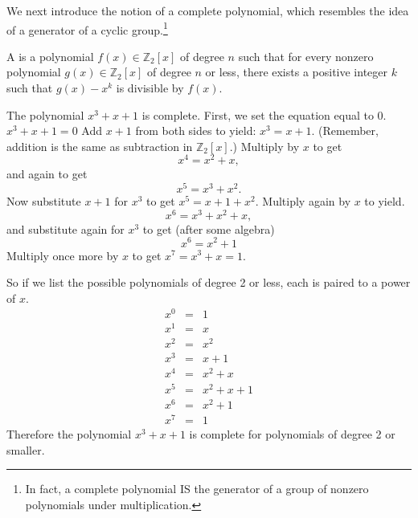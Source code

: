 %
%

We next introduce the notion of a complete polynomial, which resembles the idea of a generator of a cyclic group.\footnote{In fact, a complete polynomial IS the generator of a group of nonzero polynomials under multiplication.} 

\begin{defn}\label{defn:Completepolynomials}
A  is a polynomial $f(x)\in \mathbb{Z}_2[x]$ of degree $n$ such that for every nonzero polynomial $g(x)\in \mathbb{Z}_2[x]$ of degree $n$ or less, there exists a positive integer $k$ such that $g(x)-x^k$  is divisible by $f(x)$.
\end{defn}

\begin{example}{}
The polynomial $x^3 + x + 1$ is complete.  First, we set the equation equal to 0. $x^3 + x + 1=0$ Add $x+1$ from both sides to yield: $x^3 = x+1$. (Remember, addition is the same as subtraction in $\mathbb{Z}_2[x]$.) Multiply by $x$ to get
\[x^4 = x^2 + x,\]
and again to get
\[x^5 = x^3 + x^2.\] 
Now substitute $x+1$ for $x^3$ to get $x^5 = x + 1 + x^2$. Multiply again by $x$ to yield.
\[x^6 = x^3 + x^2 + x,\]
and substitute again for $x^3$ to get (after some algebra)
\[x^6 = x^2 + 1\]
Multiply once more by $x$ to get $x^7 = x^3 + x = 1.$

So if we list the possible polynomials of degree 2 or less, each is paired to a power of $x$.
\[
\begin{array}{lcr}
x^0 & = & 1 \\
x^1 & = & x \\ 
x^2 & = & x^2 \\ 
x^3 & = & x+1 \\ 
x^4 & = & x^2 + x \\ 
x^5 & = & x^2 + x + 1 \\ 
x^6 & = & x^2 + 1 \\ 
x^7 & = & 1 
\end{array}\]
Therefore the polynomial $x^3 + x + 1$ is complete for polynomials of degree 2 or smaller.  
\end {example}


